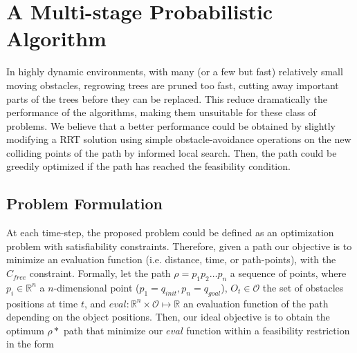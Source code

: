 \documentclass[10pt, conference, compsoc]{IEEEtran}
\begin{document}


\section{A Multi-stage Probabilistic Algorithm}\label{sec:hillclimbing}

In highly dynamic environments, with many (or a few but fast) relatively small 
moving obstacles, regrowing trees are pruned too fast, cutting away important
parts of the trees before they can be replaced. This reduce dramatically
the performance of the algorithms, making them unsuitable for these class
of problems.
We believe that a better performance could be obtained 
by slightly modifying a RRT solution using simple obstacle-avoidance
operations on the new colliding points of the path by informed local search. Then,
the path could be greedily optimized if the path has reached the feasibility condition.

\subsection{Problem Formulation}

At each time-step, the proposed problem could be defined as 
an optimization problem with satisfiability constraints.
Therefore, given a path our objective is to minimize an evaluation function 
(i.e. distance, time, or path-points), with the $C_{free}$ constraint.
Formally, let the path $\rho=p_1p_2\ldots p_n$ a sequence of points, where
$p_i \in \mathbb{R}^n$ a $n$-dimensional point ($p_1 = q_{init}, p_n = q_{goal}$), 
$O_t\in \mathcal{O} $ the set of obstacles positions
at time $t$, and $eval:\mathbb{R}^n \times \mathcal{O} \mapsto \mathbb{R}$
an evaluation function of the path depending on the object positions.
Then, our ideal objective is to obtain the optimum $\rho*$ path that
minimize our $eval$ function within a feasibility restriction in the form
\end{document}
